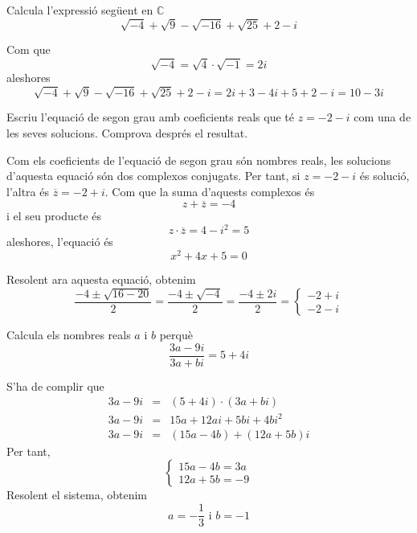 \begin{exercici}
Calcula l’expressió següent en $\mathbb{C}$
\[
\sqrt{-4}+\sqrt{9}-\sqrt{-16}+\sqrt{25}+2-i
\]
\end{exercici}

\begin{solucio}
Com que
\[
\sqrt{-4}=\sqrt{4}\cdot \sqrt{-1}=2i
\]
aleshores
\[
\sqrt{-4}+\sqrt{9}-\sqrt{-16}+\sqrt{25}+2-i=2i+3-4i+5+2-i=10-3i
\]
\end{solucio}

\begin{exercici}
Escriu l’equació de segon grau amb coeficients reals que té $
z=-2-i$ com una de les seves solucions. Comprova després el resultat.
\end{exercici}

\begin{solucio}
Com els coeficients de l’equació de segon grau són nombres
reals, les solucions d’aquesta equació són dos complexos conjugats.
Per tant, si $z=-2-i$ és solució, l’altra és $\overline{z}=-2+i$.
Com que la suma d’aquests complexos és
\[
z+\overline{z}=-4
\]
i el seu producte és
\[
z\cdot \overline{z}=4-i^{2}=5
\]
aleshores, l’equació és
\[
x^{2}+4x+5=0
\]

Resolent ara aquesta equació, obtenim
\[
\frac{-4\pm \sqrt{16-20}}{2}=\frac{-4\pm \sqrt{-4}}{2}=\frac{-4\pm 2i}{2}
=\left\{
\begin{array}{l}
-2+i \\
-2-i
\end{array}
\right.
\]
\end{solucio}

\begin{exercici}
Calcula els nombres reals $a$ i $b$ perquè
\[
\frac{3a-9i}{3a+bi}=5+4i
\]
\end{exercici}

\begin{solucio}
S’ha de complir que
\begin{eqnarray*}
3a-9i &=&(5+4i)\cdot (3a+bi) \\
3a-9i &=&15a+12ai+5bi+4bi^{2} \\
3a-9i &=&(15a-4b)+(12a+5b)i
\end{eqnarray*}
Per tant,
\[
\left\{
\begin{array}{l}
15a-4b=3a \\
12a+5b=-9
\end{array}
\right.
\]
Resolent el sistema, obtenim
\[
a=-\frac{1}{3}\text{ \ \ \ i \ \ \ }b=-1
\]
\end{solucio}

